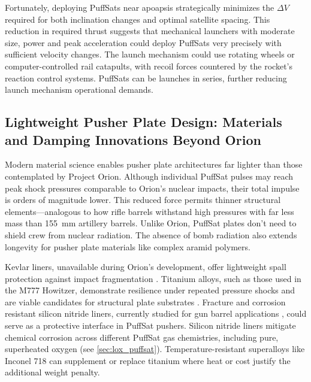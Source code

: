 \documentclass{article}
\begin{document}
{Fortunately, deploying PuffSats near apoapsis strategically minimizes the $\Delta V$ required for both inclination changes and optimal satellite spacing. This reduction in required thrust suggests that mechanical launchers with moderate size, power and peak acceleration could deploy PuffSats very precisely with sufficient velocity changes.  The launch mechanism could use rotating wheels or computer-controlled rail catapults, with recoil forces countered by the rocket's reaction control systems. PuffSats can be launches in series, further reducing launch mechanism operational demands.

\subsection{Lightweight Pusher Plate Design: Materials and Damping Innovations Beyond Orion}\label{sec:lightweight_pusher_plates}
Modern material science enables pusher plate architectures far lighter than those contemplated by Project Orion. Although individual PuffSat pulses may reach peak shock pressures comparable to Orion’s nuclear impacts, their total impulse is orders of magnitude lower. This reduced force permits thinner structural elements—analogous to how rifle barrels withstand high pressures with far less mass than \SI{155}{\milli\meter} artillery barrels. Unlike Orion, PuffSat plates don't need to shield crew from nuclear radiation.  The absence of bomb radiation also extends longevity for pusher plate materials like complex aramid polymers.

Kevlar liners, unavailable during Orion’s development, offer lightweight spall protection against impact fragmentation \cite{spall_liners}. Titanium alloys, such as those used in the M777 Howitzer, demonstrate resilience under repeated pressure shocks and are viable candidates for structural plate substrates \cite{titanium_m777}. Fracture and corrosion resistant silicon nitride liners, currently studied for gun barrel applications \cite{silicon_nitride_gun}, could serve as a protective interface in PuffSat pushers.  Silicon nitride liners mitigate chemical corrosion across different PuffSat gas chemistries, including pure, superheated oxygen (see \autoref{sec:lox_puffsat}).  Temperature-resistant superalloys like Inconel 718 \cite{inconel_718_strong} can supplement or replace titanium where heat or cost justify the additional weight penalty.

}
\end{document}
